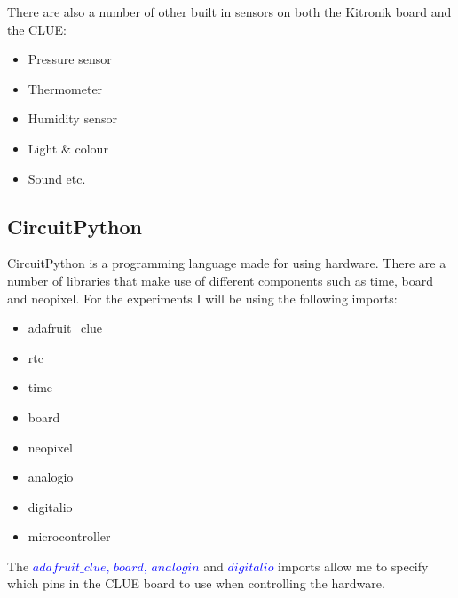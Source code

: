 There are also a number of other built in sensors on both the Kitronik board and the CLUE:

\begin{itemize}
    \item Pressure sensor
    \vspace{-0.25cm}
    \item Thermometer
    \vspace{-0.25cm}
    \item Humidity sensor
    \vspace{-0.25cm}
    \item Light \& colour
    \vspace{-0.25cm}
    \item Sound etc.
\end{itemize}

\subsection{CircuitPython}

CircuitPython is a programming language made for using hardware. There are a number of libraries that make use of different components such as time, board and neopixel. For the experiments I will be using the following imports:

\begin{itemize}
    \item adafruit\_clue \cite{adafruitGit}
    \vspace{-0.25cm}
    \item rtc \cite{circPyDoc}
    \vspace{-0.25cm}
    \item time
    \vspace{-0.25cm}
    \item board
    \vspace{-0.25cm}
    \item neopixel \cite{neopixelGit}
    \vspace{-0.25cm}
    \item analogio
    \vspace{-0.25cm}
    \item digitalio
    \vspace{-0.25cm}
    \item microcontroller
\end{itemize}

The \textcolor{blue}{$adafruit\_clue$, $board$, $analogin$} and \textcolor{blue}{$digitalio$} imports allow me to specify which pins in the CLUE board to use when controlling the hardware.

